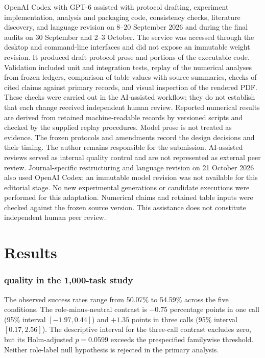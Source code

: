 \documentclass[10pt,letterpaper]{article}
\begin{document}
OpenAI Codex with GPT-6 assisted with protocol drafting, experiment implementation, analysis and packaging code, consistency checks, literature discovery, and language revision on 8--20 September 2026 and during the final audits on 30 September and 2--3 October. The service was accessed through the desktop and command-line interfaces and did not expose an immutable weight revision. It produced draft protocol prose and portions of the executable code. Validation included unit and integration tests, replay of the numerical analyses from frozen ledgers, comparison of table values with source summaries, checks of cited claims against primary records, and visual inspection of the rendered PDF. These checks were carried out in the AI-assisted workflow; they do not establish that each change received independent human review. Reported numerical results are derived from retained machine-readable records by versioned scripts and checked by the supplied replay procedures. Model prose is not treated as evidence. The frozen protocols and amendments record the design decisions and their timing. The author remains responsible for the submission. AI-assisted reviews served as internal quality control and are not represented as external peer review. Journal-specific restructuring and language revision on 21 October 2026 also used OpenAI Codex; an immutable model revision was not available for this editorial stage. No new experimental generations or candidate executions were performed for this adaptation. Numerical claims and retained table inputs were checked against the frozen source version. This assistance does not constitute independent human peer review.

\section*{Results}
\subsubsection*{quality in the 1,000-task study}
The observed success rates range from 50.07\% to 54.59\% across the five conditions. The role-minus-neutral contrast is $-0.75$ percentage points in one call (95\% interval $[-1.97,0.44]$) and $+1.35$ points in three calls (95\% interval $[0.17,2.56]$). The descriptive interval for the three-call contrast excludes zero, but its Holm-adjusted $p=0.0599$ exceeds the prespecified familywise threshold. Neither role-label null hypothesis is rejected in the primary analysis.
\end{document}
